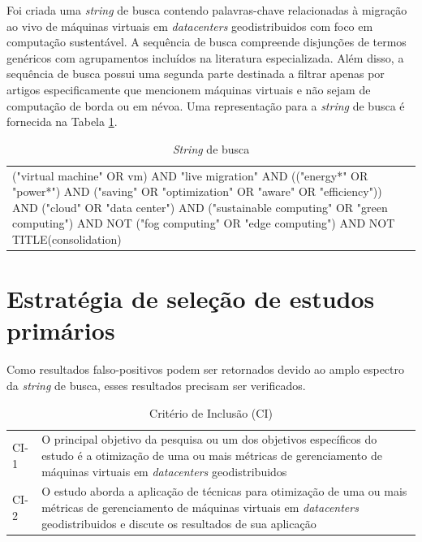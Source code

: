 \documentclass[
	12pt,				%
	oneside,			%
	a4paper,			%
	english,			%
	brazil				%
	]{abntex2ppgsi}
\begin{document}
\begin{apendicesenv}
Foi criada uma \textit{string} de busca contendo palavras-chave relacionadas à migração ao vivo de máquinas virtuais em \textit{datacenters} geodistribuidos com foco em computação sustentável. A sequência de busca compreende disjunções de termos genéricos com agrupamentos incluídos na literatura especializada. Além disso, a sequência de busca possui uma segunda parte destinada a filtrar apenas por artigos especificamente que mencionem máquinas virtuais e não sejam de computação de borda ou em névoa. Uma representação para a \textit{string} de busca é fornecida na Tabela \ref{tab:StringDeBusca}.

\begin{table}[htbp]
	\centering
	\caption{\textit{String} de busca}
		\begin{tabular}{p{6in} } \hline
			("virtual machine" OR vm) AND "live migration" AND (("energy*" OR "power*") AND ("saving" OR "optimization" OR "aware" OR "efficiency")) AND ("cloud" OR "data center") AND ("sustainable computing" OR "green computing") AND NOT ("fog computing" OR "edge computing") AND NOT TITLE(consolidation)
		\end{tabular}
	\label{tab:StringDeBusca}
\end{table}

\section{Estratégia de seleção de estudos primários}\label{section:estrategia-de-selecao-de-estudos-primarios}

Como resultados falso-positivos podem ser retornados devido ao amplo espectro da \textit{string} de busca, esses resultados precisam ser verificados.

\begin{table}[htbp]
	\centering
	\caption{Critério de Inclusão (CI)}
		\begin{tabular}{p{1in} p{5in} } \hline

		CI-1	& O principal objetivo da pesquisa ou um dos objetivos específicos do estudo é a otimização de uma ou mais métricas de gerenciamento de máquinas virtuais em \textit{datacenters} geodistribuidos \\
		CI-2	& O estudo aborda a aplicação de técnicas para otimização de uma ou mais métricas de gerenciamento de máquinas virtuais em \textit{datacenters} geodistribuidos e discute os resultados de sua aplicação \\ \hline

		\end{tabular}
	\label{tab:TabelaCriteriosInclusao}
\end{table}


\end{apendicesenv}
\end{document}
